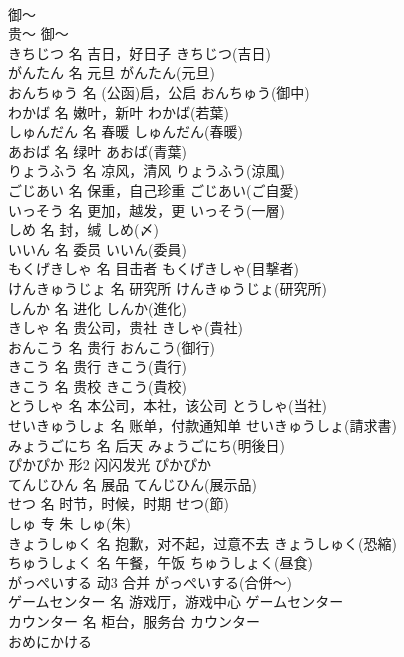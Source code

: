 \documentclass[8pt]{extreport}
\begin{document}
\begin{CJK}{UTF8}{min}
\\	御～	
\\	贵～	御～	
\\	きちじつ	名	吉日，好日子	きちじつ(吉日)	
\\	がんたん	名	元旦	がんたん(元旦)	
\\	おんちゅう	名	(公函)启，公启	おんちゅう(御中)	
\\	わかば	名	嫩叶，新叶	わかば(若葉)	
\\	しゅんだん	名	春暖	しゅんだん(春暖)	
\\	あおば	名	绿叶	あおば(青葉)	
\\	りょうふう	名	凉风，清风	りょうふう(涼風)	
\\	ごじあい	名	保重，自己珍重	ごじあい(ご自愛)	
\\	いっそう	名	更加，越发，更	いっそう(一層)	
\\	しめ	名	封，缄	しめ(〆)	
\\	いいん	名	委员	いいん(委員)	
\\	もくげきしゃ	名	目击者	もくげきしゃ(目撃者)	
\\	けんきゅうじょ	名	研究所	けんきゅうじょ(研究所)	
\\	しんか	名	进化	しんか(進化)	
\\	きしゃ	名	贵公司，贵社	きしゃ(貴社)	
\\	おんこう	名	贵行	おんこう(御行)	
\\	きこう	名	贵行	きこう(貴行)	
\\	きこう	名	贵校	きこう(貴校)	
\\	とうしゃ	名	本公司，本社，该公司	とうしゃ(当社)	
\\	せいきゅうしょ	名	账单，付款通知单	せいきゅうしょ(請求書)	
\\	みょうごにち	名	后天	みょうごにち(明後日)	
\\	ぴかぴか	形2	闪闪发光	ぴかぴか	
\\	てんじひん	名	展品	てんじひん(展示品)	
\\	せつ	名	时节，时候，时期	せつ(節)	
\\	しゅ	专	朱	しゅ(朱)	
\\	きょうしゅく	名	抱歉，对不起，过意不去	きょうしゅく(恐縮)	
\\	ちゅうしょく	名	午餐，午饭	ちゅうしょく(昼食)	
\\	がっぺいする	动3	合并	がっぺいする(合併～)	
\\	ゲームセンター	名	游戏厅，游戏中心	ゲームセンター	
\\	カウンター	名	柜台，服务台	カウンター	
\\	おめにかける	

\end{CJK}
\end{document}
